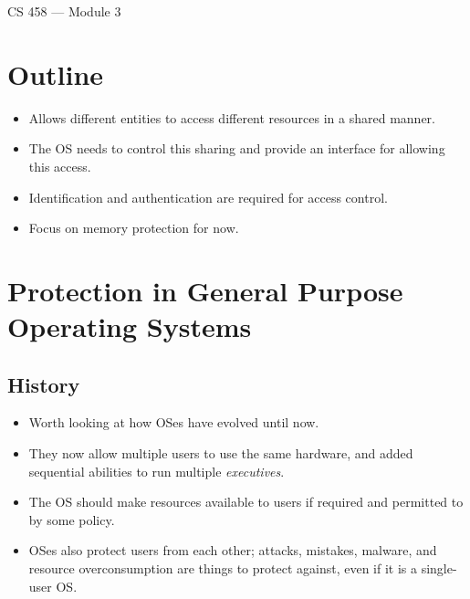 \documentclass{article}
\author{Clement Tsang}
\begin{document}
\begin{center}
    \Large{CS 458 --- Module 3}
\end{center}

\section{Outline}
\begin{itemize}
    \item Allows different entities to access different resources in a shared manner.
    \item The OS needs to control this sharing and provide an interface for allowing this access.
    \item Identification and authentication are required for access control.
    \item Focus on memory protection for now.
\end{itemize}

\section{Protection in General Purpose Operating Systems}
\subsection{History}
\begin{itemize}
    \item Worth looking at how OSes have evolved until now.
    \item They now allow multiple users to use the same hardware, and added sequential abilities to run multiple \emph{executives}.  
    \item The OS should make resources available to users if required and permitted to by some policy.
    \item OSes also protect users from each other; attacks, mistakes, malware, and resource overconsumption are things to protect against, even if it is a single-user OS.
\end{itemize}
\end{document}
